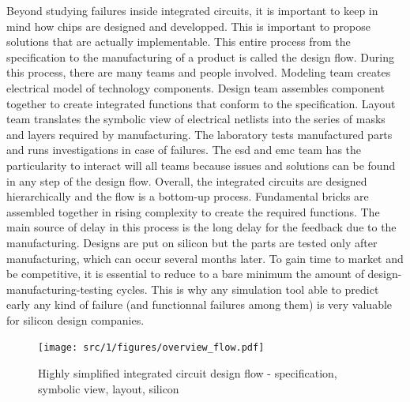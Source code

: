 Beyond studying failures inside integrated circuits, it is important to keep in mind how chips are designed and developped.
This is important to propose solutions that are actually implementable.
This entire process from the specification to the manufacturing of a product is called the design flow.
During this process, there are many teams and people involved.
Modeling team creates electrical model of technology components.
Design team assembles component together to create integrated functions that conform to the specification.
Layout team translates the symbolic view of electrical netlists into the series of masks and layers required by manufacturing.
The laboratory tests manufactured parts and runs investigations in case of failures.
The \gls{esd} and \gls{emc} team has the particularity to interact will all teams because issues and solutions can be found in any step of the design flow.
Overall, the integrated circuits are designed hierarchically and the flow is a bottom-up process.
Fundamental bricks are assembled together in rising complexity to create the required functions.
The main source of delay in this process is the long delay for the feedback due to the manufacturing.
Designs are put on silicon but the parts are tested only after manufacturing, which can occur several months later.
To gain time to market and be competitive, it is essential to reduce to a bare minimum the amount of design-manufacturing-testing cycles.
This is why any simulation tool able to predict early any kind of failure (and functionnal failures among them) is very valuable for silicon design companies.

\begin{figure}[!h]
  \centering
  \texttt{[image: src/1/figures/overview\_flow.pdf]}
  \caption{Highly simplified integrated circuit design flow - specification, symbolic view, layout, silicon}
  \label{fig:ic-design-flow}
\end{figure}

